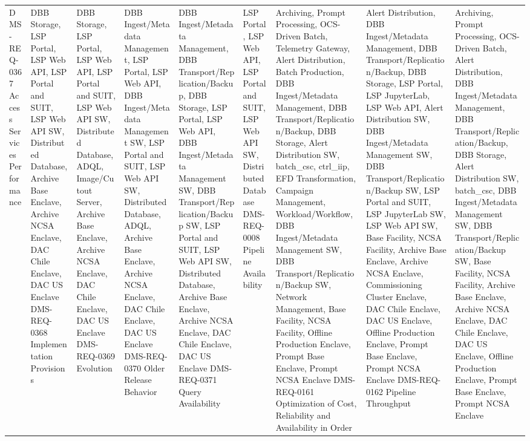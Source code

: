\begin{xtabular}{p{0.4\textwidth}p{0.55\textwidth}}
DMS-REQ-0367 Access Services Performance & DBB Storage, LSP Portal, LSP Web API, LSP Portal and SUIT, LSP Web API SW, Distributed Database, Archive Base Enclave, Archive NCSA Enclave, DAC Chile Enclave, DAC US Enclave
DMS-REQ-0368 Implementation Provisions & DBB Storage, LSP Portal, LSP Web API, LSP Portal and SUIT, LSP Web API SW, Distributed Database, ADQL, Image/Cutout Server, Archive Base Enclave, Archive NCSA Enclave, DAC Chile Enclave, DAC US Enclave
DMS-REQ-0369 Evolution & DBB Ingest/Metadata Management, LSP Portal, LSP Web API, DBB Ingest/Metadata Management SW, LSP Portal and SUIT, LSP Web API SW, Distributed Database, ADQL, Archive Base Enclave, Archive NCSA Enclave, DAC Chile Enclave, DAC US Enclave
DMS-REQ-0370 Older Release Behavior & DBB Ingest/Metadata Management, DBB Transport/Replication/Backup, DBB Storage, LSP Portal, LSP Web API, DBB Ingest/Metadata Management SW, DBB Transport/Replication/Backup SW, LSP Portal and SUIT, LSP Web API SW, Distributed Database, Archive Base Enclave, Archive NCSA Enclave, DAC Chile Enclave, DAC US Enclave
DMS-REQ-0371 Query Availability & LSP Portal, LSP Web API, LSP Portal and SUIT, LSP Web API SW, Distributed Database
DMS-REQ-0008 Pipeline Availability & Archiving, Prompt Processing, OCS-Driven Batch, Telemetry Gateway, Alert Distribution, Batch Production, DBB Ingest/Metadata Management, DBB Transport/Replication/Backup, DBB Storage, Alert Distribution SW, batch_csc, ctrl_iip, EFD Transformation, Campaign Management, Workload/Workflow, DBB Ingest/Metadata Management SW, DBB Transport/Replication/Backup SW, Network Management, Base Facility, NCSA Facility, Offline Production Enclave, Prompt Base Enclave, Prompt NCSA Enclave
DMS-REQ-0161 Optimization of Cost, Reliability and Availability in Order & Alert Distribution, DBB Ingest/Metadata Management, DBB Transport/Replication/Backup, DBB Storage, LSP Portal, LSP JupyterLab, LSP Web API, Alert Distribution SW, DBB Ingest/Metadata Management SW, DBB Transport/Replication/Backup SW, LSP Portal and SUIT, LSP JupyterLab SW, LSP Web API SW, Base Facility, NCSA Facility, Archive Base Enclave, Archive NCSA Enclave, Commissioning Cluster Enclave, DAC Chile Enclave, DAC US Enclave, Offline Production Enclave, Prompt Base Enclave, Prompt NCSA Enclave
DMS-REQ-0162 Pipeline Throughput & Archiving, Prompt Processing, OCS-Driven Batch, Alert Distribution, DBB Ingest/Metadata Management, DBB Transport/Replication/Backup, DBB Storage, Alert Distribution SW, batch_csc, DBB Ingest/Metadata Management SW, DBB Transport/Replication/Backup SW, Base Facility, NCSA Facility, Archive Base Enclave, Archive NCSA Enclave, DAC Chile Enclave, DAC US Enclave, Offline Production Enclave, Prompt Base Enclave, Prompt NCSA Enclave

\end{xtabular}
